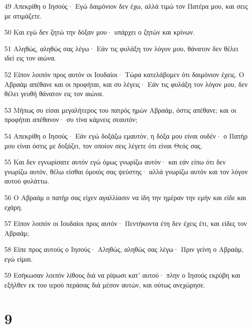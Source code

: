 \par 49 Απεκρίθη ο Ιησούς· Εγώ δαιμόνιον δεν έχω, αλλά τιμώ τον Πατέρα μου, και σεις με ατιμάζετε.
\par 50 Και εγώ δεν ζητώ την δόξαν μου· υπάρχει ο ζητών και κρίνων.
\par 51 Αληθώς, αληθώς σας λέγω· Εάν τις φυλάξη τον λόγον μου, θάνατον δεν θέλει ιδεί εις τον αιώνα.
\par 52 Είπον λοιπόν προς αυτόν οι Ιουδαίοι· Τώρα κατελάβομεν ότι δαιμόνιον έχεις. Ο Αβραάμ απέθανε και οι προφήται, και συ λέγεις· Εάν τις φυλάξη τον λόγον μου, δεν θέλει γευθή θάνατον εις τον αιώνα.
\par 53 Μήπως συ είσαι μεγαλήτερος του πατρός ημών Αβραάμ, όστις απέθανε; και οι προφήται απέθανον· συ τίνα κάμνεις σεαυτόν;
\par 54 Απεκρίθη ο Ιησούς· Εάν εγώ δοξάζω εμαυτόν, η δόξα μου είναι ουδέν· ο Πατήρ μου είναι όστις με δοξάζει, τον οποίον σεις λέγετε ότι είναι Θεός σας.
\par 55 Και δεν εγνωρίσατε αυτόν εγώ όμως γνωρίζω αυτόν· και εάν είπω ότι δεν γνωρίζω αυτόν, θέλω είσθαι όμοιός σας ψεύστης· αλλά γνωρίζω αυτόν και τον λόγον αυτού φυλάττω.
\par 56 Ο Αβραάμ ο πατήρ σας είχεν αγαλλίασιν να ίδη την ημέραν την εμήν και είδε και εχάρη.
\par 57 Είπον λοιπόν οι Ιουδαίοι προς αυτόν· Πεντήκοντα έτη δεν έχεις έτι, και είδες τον Αβραάμ;
\par 58 Είπε προς αυτούς ο Ιησούς· Αληθώς, αληθώς σας λέγω· Πριν γείνη ο Αβραάμ, εγώ είμαι.
\par 59 Εσήκωσαν λοιπόν λίθους διά να ρίψωσι κατ' αυτού· πλην ο Ιησούς εκρύβη και εξήλθεν εκ του ιερού περάσας διά μέσον αυτών, και ούτως ανεχώρησε.

\chapter{9}

